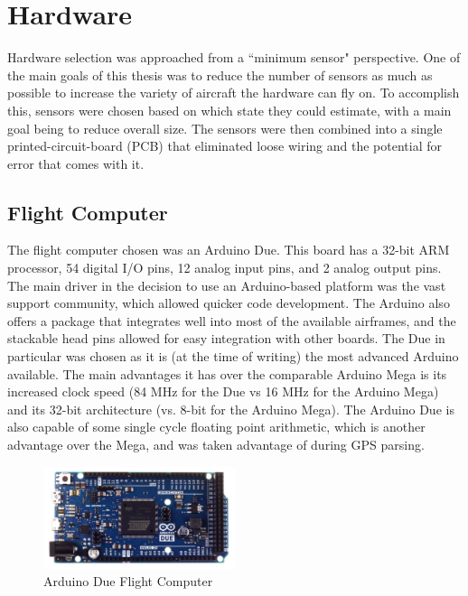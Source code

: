 \chapter{Hardware}
\label{hardware}
Hardware selection was approached from a ``minimum sensor" perspective. One of the main goals of this thesis was to reduce the number of sensors as much as possible to increase the variety of aircraft the hardware can fly on. To accomplish this, sensors were chosen based on which state they could estimate, with a main goal being to reduce overall size. The sensors were then combined into a single printed-circuit-board (PCB) that eliminated loose wiring and the potential for error that comes with it. 

\section{Flight Computer}
The flight computer chosen was an Arduino Due. This board has a 32-bit ARM processor, 54 digital I/O pins, 12 analog input pins, and 2 analog output pins. The main driver in the decision to use an Arduino-based platform was the vast support community, which allowed quicker code development. The Arduino also offers a package that integrates well into most of the available airframes, and the stackable head pins allowed for easy integration with other boards. The Due in particular was chosen as it is (at the time of writing) the most advanced Arduino available. The main advantages it has over the comparable Arduino Mega is its increased clock speed (84 MHz for the Due\cite{Atmel2012} vs 16 MHz for the Arduino Mega\cite{Atmel2012atmega}) and its 32-bit architecture (vs. 8-bit for the Arduino Mega). The Arduino Due is also capable of some single cycle floating point arithmetic\cite{Atmel2012}, which is another advantage over the Mega, and was taken advantage of during GPS parsing.

\begin{figure}[H]
  \caption{Arduino Due Flight Computer} \label{arduinoPicture}
  \centering
    \includegraphics[width=0.5\textwidth]{figures/arduinoDue.jpg}
\end{figure}

